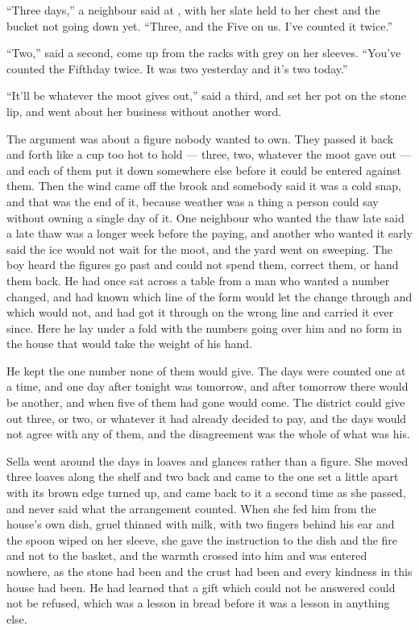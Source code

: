 “Three days,” a neighbour said at , with her slate held to her chest and the bucket not going down yet. “Three, and the Five on us. I've counted it twice.”

“Two,” said a second, come up from the racks with grey on her sleeves. “You've counted the Fifthday twice. It was two yesterday and it's two today.”

“It'll be whatever the moot gives out,” said a third, and set her pot on the stone lip, and went about her business without another word.

The argument was about a figure nobody wanted to own. They passed it back and forth like a cup too hot to hold --- three, two, whatever the moot gave out --- and each of them put it down somewhere else before it could be entered against them. Then the wind came off the brook and somebody said it was a cold snap, and that was the end of it, because weather was a thing a person could say without owning a single day of it. One neighbour who wanted the thaw late said a late thaw was a longer week before the paying, and another who wanted it early said the ice would not wait for the moot, and the yard went on sweeping. The boy heard the figures go past and could not spend them, correct them, or hand them back. He had once sat across a table from a man who wanted a number changed, and had known which line of the form would let the change through and which would not, and had got it through on the wrong line and carried it ever since. Here he lay under a fold with the numbers going over him and no form in the house that would take the weight of his hand.

He kept the one number none of them would give. The days were counted one at a time, and one day after tonight was tomorrow, and after tomorrow there would be another, and when five of them had gone  would come. The district could give out three, or two, or whatever it had already decided to pay, and the days would not agree with any of them, and the disagreement was the whole of what was his.

Sella went around the days in loaves and glances rather than a figure. She moved three loaves along the shelf and two back and came to the one set a little apart with its brown edge turned up, and came back to it a second time as she passed, and never said what the arrangement counted. When she fed him from the house's own dish, gruel thinned with milk, with two fingers behind his ear and the spoon wiped on her sleeve, she gave the instruction to the dish and the fire and not to the basket, and the warmth crossed into him and was entered nowhere, as the stone had been and the crust had been and every kindness in this house had been. He had learned that a gift which could not be answered could not be refused, which was a lesson in bread before it was a lesson in anything else.

